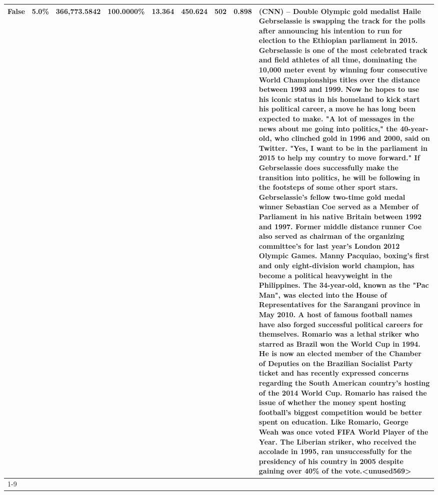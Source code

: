 \begin{table}[H]
{\begin{tabular}{lllrlllll}
False & 5.0\% & 366,773.5842 & \bfseries \color{red} 100.0000\% & 13.364 & 450.624 & 502 & 0.898 & (CNN) -- Double Olympic gold medalist Haile Gebrselassie is swapping the track for the polls after announcing his intention to run for election to the Ethiopian parliament in 2015. Gebrselassie is one of the most celebrated track and field athletes of all time, dominating the 10,000 meter event by winning four consecutive World Championships titles over the distance between 1993 and 1999. Now he hopes to use his iconic status in his homeland to kick start his political career, a move he has long been expected to make. "A lot of messages in the news about me going into politics," the 40-year-old, who clinched gold in 1996 and 2000, said on Twitter. "Yes, I want to be in the parliament in 2015 to help my country to move forward." If Gebrselassie does successfully make the transition into politics, he will be following in the footsteps of some other sport stars. Gebrselassie's fellow two-time gold medal winner Sebastian Coe served as a Member of Parliament in his native Britain between 1992 and 1997. Former middle distance runner Coe also served as chairman of the organizing committee's for last year's London 2012 Olympic Games. Manny Pacquiao, boxing's first and only eight-division world champion, has become a political heavyweight in the Philippines. The 34-year-old, known as the "Pac Man", was elected into the House of Representatives for the Sarangani province in May 2010. A host of famous football names have also forged successful political careers for themselves. Romario was a lethal striker who starred as Brazil won the World Cup in 1994. He is now an elected member of the Chamber of Deputies on the Brazilian Socialist Party ticket and has recently expressed concerns regarding the South American country's hosting of the 2014 World Cup. Romario has raised the issue of whether the money spent hosting football's biggest competition would be better spent on education. Like Romario, George Weah was once voted FIFA World Player of the Year. The Liberian striker, who received the accolade in 1995, ran unsuccessfully for the presidency of his country in 2005 despite gaining over 40\% of the vote.<unused569> \\
\cline{1-9}

\end{tabular}}
\end{table}
